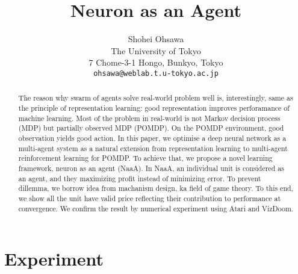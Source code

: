 \documentclass{article} %
\title{Neuron as an Agent}
\author{Shohei Ohsawa \\
The University of Tokyo\\
7 Chome-3-1 Hongo, Bunkyo, Tokyo \\
\texttt{ohsawa@weblab.t.u-tokyo.ac.jp} \\
}
\begin{document}
\maketitle

\begin{abstract}
The reason why swarm of agents solve real-world problem well is, interestingly,
same as the principle of representation learning: good representation improves
perforamance of machine learning. Most of the problem in real-world is not
Markov decision process (MDP) but partially observed MDP (POMDP). On the
POMDP environment, good observation yields good action. In this paper, we
optimise a deep neural network as a multi-agent system as a natural extension
from representation learning to multi-agent reinforcement learning for POMDP.
To achieve that, we propose a novel learning framework, neuron as an agent
(NaaA). In NaaA, an individual unit is considered as an agent, and they maximizing
profit instead of minimizing error. To prevent dillemma, we borrow idea
from machanism design, ka field of game theory. To this end, we show all the unit
have valid price reflecting their contribution to performance at convergence. We
confirm the result by numerical experiment using Atari and VizDoom.
\end{abstract}





\section{Experiment}




\end{document}
